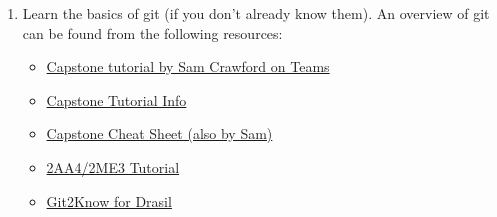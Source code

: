 \documentclass[12pt]{article}
\begin{document}
\begin{enumerate}
\item Learn the basics of git (if you don't already know them).  An overview of
git can be found from the following resources:

\begin{itemize} \item
\href{https://mcmasteru365.sharepoint.com/:v:/r/sites/SummerDrasil/Shared\%20Documents/General/Recordings/Git\%20Tutorial-20220912_143247-Meeting\%20Recording.mp4?csf=1&web=1&e=AmDDmv}
{Capstone tutorial by Sam Crawford on Teams}

\item
\href{https://gitlab.cas.mcmaster.ca/courses/capstone/-/tree/main/Tutorials/T01_GitGitHub}
{Capstone Tutorial Info}

\item
\href{https://gitlab.cas.mcmaster.ca/courses/capstone/-/blob/main/Tutorials/T01_GitGitHub/GitCheatsheet.pdf}
{Capstone Cheat Sheet (also by Sam)}

\item
\href{https://gitlab.cas.mcmaster.ca/smiths/se2aa4_cs2me3/-/tree/master/Tutorials/T01a-VM-VersionControl/slides}
{2AA4/2ME3 Tutorial}

\item \href{https://github.com/JacquesCarette/Drasil/wiki/Git2Know-for-Drasil } {Git2Know for Drasil} 
\end{itemize}

\end{enumerate}
\end{document}
